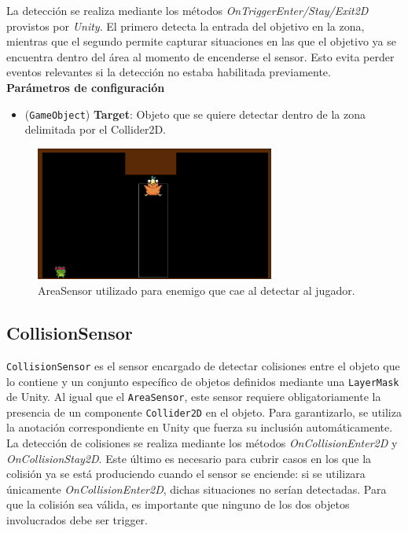 La detección se realiza mediante los métodos \textit{OnTriggerEnter/Stay/Exit2D} provistos por \textit{Unity}. 
El primero detecta la entrada del objetivo en la zona, mientras que el segundo permite capturar situaciones en las que el objetivo ya se encuentra dentro del área al momento de encenderse el sensor. Esto evita perder eventos relevantes si la detección no estaba habilitada previamente.\\

\textbf{Parámetros de configuración}
\begin{itemize}
	\item (\texttt{GameObject}) \textbf{Target}: Objeto que se quiere detectar dentro de la zona delimitada por el Collider2D.
\end{itemize}

\begin{figure}[t]
		\centering
		\includegraphics[width = 0.7\textwidth]{Imagenes/AreaSensor_Image.png}
		\caption{AreaSensor utilizado para enemigo que cae al detectar al jugador.}
		\label{fig:AreaSensor_Image}
\end{figure}
\subsection{CollisionSensor}
\texttt{CollisionSensor} es el sensor encargado de detectar colisiones entre el objeto que lo contiene y un conjunto específico de objetos definidos mediante una \texttt{LayerMask} de Unity. Al igual que el \texttt{AreaSensor}, este sensor requiere obligatoriamente la presencia de un componente \texttt{Collider2D} en el objeto. Para garantizarlo, se utiliza la anotación correspondiente en Unity que fuerza su inclusión automáticamente.\\

La detección de colisiones se realiza mediante los métodos \textit{OnCollisionEnter2D} y \textit{OnCollisionStay2D}. Este último es necesario para cubrir casos en los que la colisión ya se está produciendo cuando el sensor se enciende: si se utilizara únicamente \textit{OnCollisionEnter2D}, dichas situaciones no serían detectadas. Para que la colisión sea válida, es importante que ninguno de los dos objetos involucrados debe ser trigger.


